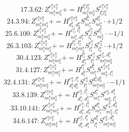 \documentclass[letterpaper,10pt,fleqn,leqno,onecolumn]{article}
\begin{document}
\begin{equation} \;\;\;\;\;\;  17.3.62: Z^{e_{1}^{a}e_{2}^{a}}_{m_{1}^{a}m_{2}^{a}}+=H^{l_{1}^{a}l_{2}^{a}}_{m_{1}^{a}m_{2}^{a}}S^{e_{1}^{a}e_{2}^{a}}_{l_{1}^{a}l_{2}^{a}} \end{equation}
\begin{equation} \;\;\;\;\;\;  24.3.94: Z^{e_{1}^{a}e_{2}^{a}}_{m_{1}^{a}m_{2}^{a}}+=H^{e_{1}^{a}e_{2}^{a}}_{d_{1}^{a},d_{2}^{a}}S^{d_{1}^{a}}_{m_{1}^{a}}S^{d_{2}^{a}}_{m_{2}^{a}}\cdot +1/2 \end{equation}
\begin{equation} \;\;\;\;\;\;  25.6.100: Z^{e_{1}^{a}e_{2}^{a}}_{m_{1}^{a}m_{2}^{a}}+=H^{e_{1}^{a},l_{1}^{a}}_{m_{1}^{a},d_{1}^{a}}S^{e_{2}^{a}}_{l_{1}^{a}}S^{d_{1}^{a}}_{m_{2}^{a}}\cdot -1/1 \end{equation}
\begin{equation} \;\;\;\;\;\;  26.3.103: Z^{e_{1}^{a}e_{2}^{a}}_{m_{1}^{a}m_{2}^{a}}+=H^{l_{1}^{a},l_{2}^{a}}_{m_{1}^{a}m_{2}^{a}}S^{e_{1}^{a}}_{l_{1}^{a}}S^{e_{2}^{a}}_{l_{2}^{a}}\cdot +1/2 \end{equation}
\begin{equation} \;\;\;\;\;\;  30.4.123: Z^{e_{1}^{a}e_{2}^{a}}_{m_{1}^{a}m_{2}^{a}}+=H^{l_{1}^{a}}_{d_{1}^{a}}S^{e_{1}^{a}}_{l_{1}^{a}}S^{e_{2}^{a},d_{1}^{a}}_{m_{1}^{a}m_{2}^{a}} \end{equation}
\begin{equation} \;\;\;\;\;\;  31.4.127: Z^{e_{1}^{a}e_{2}^{a}}_{m_{1}^{a}m_{2}^{a}}+=H^{l_{1}^{a}}_{d_{1}^{a}}S^{d_{1}^{a}}_{m_{1}^{a}}S^{e_{1}^{a}e_{2}^{a}}_{m_{2}^{a},l_{1}^{a}} \end{equation}
\begin{equation} \;\;\;\;\;\;  32.4.131: Z^{e_{1}^{a}e_{2}^{a}}_{m_{1}^{a}m_{2}^{a}}+=H^{e_{1}^{a},l_{1}^{a}}_{d_{1}^{a}d_{2}^{a}}S^{e_{2}^{a}}_{l_{1}^{a}}S^{d_{1}^{a}d_{2}^{a}}_{m_{1}^{a}m_{2}^{a}}\cdot -1/1 \end{equation}
\begin{equation} \;\;\;\;\;\;  33.8.139: Z^{e_{1}^{a}e_{2}^{a}}_{m_{1}^{a}m_{2}^{a}}+=H^{e_{1}^{a},l_{1}^{b}}_{d_{1}^{a},d_{1}^{b}}S^{d_{1}^{a}}_{m_{1}^{a}}S^{e_{2}^{a},d_{1}^{b}}_{m_{2}^{a},l_{1}^{b}} \end{equation}
\begin{equation} \;\;\;\;\;\;  33.10.141: Z^{e_{1}^{a}e_{2}^{a}}_{m_{1}^{a}m_{2}^{a}}+=H^{e_{1}^{a},l_{1}^{a}}_{d_{1}^{a},d_{2}^{a}}S^{d_{1}^{a}}_{m_{1}^{a}}S^{e_{2}^{a},d_{2}^{a}}_{m_{2}^{a},l_{1}^{a}} \end{equation}
\begin{equation} \;\;\;\;\;\;  34.6.147: Z^{e_{1}^{a}e_{2}^{a}}_{m_{1}^{a}m_{2}^{a}}+=H^{e_{1}^{a},l_{1}^{b}}_{d_{1}^{b},d_{1}^{a}}S^{d_{1}^{b}}_{l_{1}^{b}}S^{e_{2}^{a},d_{1}^{a}}_{m_{1}^{a}m_{2}^{a}} \end{equation}
\end{document}
